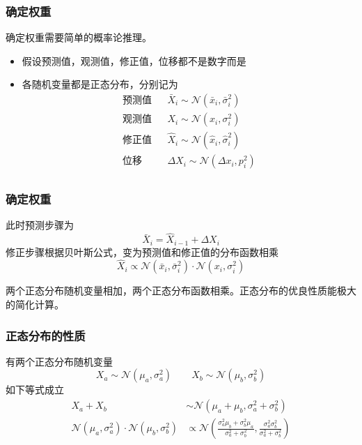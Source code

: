 \documentclass[14pt]{beamer}
\newcommand{\DN}{\mathcal{N}}
\let\emph\relax %
\begin{document}
\begin{frame}
  \frametitle{确定权重}
  确定权重需要简单的概率论推理。
  \begin{itemize}
    \item 假设预测值，观测值，修正值，位移都不是数字而是\emph{随机变量}
    \item 各随机变量都是正态分布，分别记为
    \begin{equation*}
      \begin{array}{rll}
        \text{预测值} && \bar{X}_i\sim \DN(\bar{x}_i, \bar{\sigma}_i^2)\\
        \text{观测值} && X_i\sim \DN(x_i, \sigma_i^2)\\
        \text{修正值} && \hat{X}_i\sim \DN(\hat{x}_i, \hat{\sigma}_i^2)\\
        \text{位移} && \Delta X_i\sim \DN(\Delta x_i, p_i^2)\\
      \end{array}
    \end{equation*}
  \end{itemize}
\end{frame}

\begin{frame}
  \frametitle{确定权重}
  此时预测步骤为
  $$\bar{X}_i=\hat{X}_{i-1}+\Delta X_i$$
  修正步骤根据贝叶斯公式，变为预测值和修正值的分布函数相乘
  $$\hat{X}_i\propto\DN(\bar{x}_i, \bar{\sigma}_i^2)\cdot
  \DN(x_i, \sigma_i^2)$$

  两个正态分布随机变量相加，两个正态分布函数相乘。正态分布的优良性质能极大的简化计算。
\end{frame}

\begin{frame}
  \frametitle{正态分布的性质}
  有两个正态分布随机变量
  $$X_a\sim\DN(\mu_a, \sigma_a^2)\qquad X_b\sim\DN(\mu_b, \sigma_b^2)$$
  如下等式成立
  \begin{align*}
    X_a+X_b&\sim \DN(\mu_a+\mu_b,\sigma_a^2+\sigma_b^2)\\
    \DN(\mu_a, \sigma_a^2)\cdot\DN(\mu_b, \sigma_b^2)&\propto
    \DN(\frac{\sigma_a^2\mu_b+\sigma_b^2\mu_a}{\sigma_a^2+\sigma_b^2},
    \frac{\sigma_a^2\sigma_b^2}{\sigma_a^2+\sigma_b^2})
  \end{align*}
\end{frame}
\end{document}
